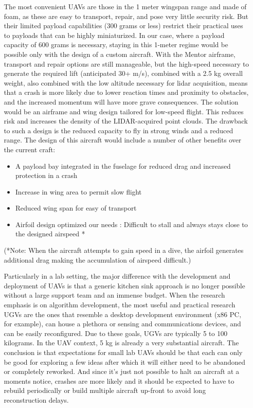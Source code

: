 \documentclass[a4paper,11pt]{report}
\begin{document}
The most convenient UAVs are those in the 1 meter wingspan range and made of foam, as these are easy to transport, repair, and pose very little security risk. But their limited payload capabilities (300 grams or less) restrict their practical uses to payloads that can be highly miniaturized. In our case, where a payload capacity of 600 grams is necessary, staying in this 1-meter regime would be possible only with the design of a custom aircraft. With the Mentor airframe, transport and repair options are still manageable, but the high-speed necessary to generate the required lift (anticipated 30+ m/s), combined with a 2.5 kg overall weight, also combined with the low altitude necessary for lidar acquisition, means that a crash is more likely due to lower reaction times and proximity to obstacles, and the increased momentum will have more grave consequences. The solution would be an airframe and wing design tailored for low-speed flight. This reduces risk and increases the density of the LIDAR-acquired point clouds. The drawback to such a design is the reduced capacity to fly in strong winds and a reduced range. The design of this aircraft would include a number of other benefits over the current craft: 

\begin{itemize}
 \item A payload bay integrated in the fuselage for reduced drag and increased protection in a crash
 \item Increase in wing area to permit slow flight
 \item Reduced wing span for easy of transport
 \item Airfoil design optimized our needs : Difficult to stall and always stays close to the designed airspeed *
\end{itemize}

(*Note: When the aircraft attempts to gain speed in a dive, the airfoil generates additional drag making the accumulation of airspeed difficult.)

Particularly in a lab setting, the major difference with the development and deployment of UAVs is that a generic kitchen sink approach is no longer possible without a large support team and an immense budget. When the research emphasis is on algorithm development, the most useful and practical research UGVs are the ones that resemble a desktop development environment (x86 PC, for example), can house a plethora or sensing and communications devices, and can be easily reconfigured. Due to these goals, UGVs are typically 5 to 100 kilograms. In the UAV context, 5 kg is already a very substantial aircraft. The conclusion is that expectations for small lab UAVs should be that each can only be good for exploring a few ideas after which it will either need to be abandoned or completely reworked. And since it's just not possible to halt an aircraft at a moments notice, crashes are more likely and it should be expected to have to rebuild periodically or build multiple aircraft up-front to avoid long reconstruction delays.
\end{document}
